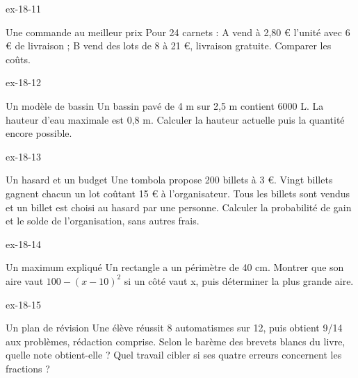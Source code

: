 \clearpage{}
\begin{blocLivre}{ex-18-11}\begin{exercice}[3]{Une commande au meilleur prix}
Pour 24 carnets : A vend à 2,80 € l’unité avec 6 € de livraison ; B vend des lots de 8 à 21 €, livraison gratuite. Comparer les coûts.
\end{exercice}\end{blocLivre}
\begin{blocLivre}{ex-18-12}\begin{exercice}[3]{Un modèle de bassin}
Un bassin pavé de 4 m sur 2,5 m contient 6000 L. La hauteur d’eau maximale est 0,8 m. Calculer la hauteur actuelle puis la quantité encore possible.
\label{fig-ex-18-12}
\end{exercice}\end{blocLivre}
\begin{blocLivre}{ex-18-13}\begin{exercice}[3]{Un hasard et un budget}
Une tombola propose 200 billets à 3 €. Vingt billets gagnent chacun un lot coûtant 15 € à l’organisateur. Tous les billets sont vendus et un billet est choisi au hasard par une personne. Calculer la probabilité de gain et le solde de l’organisation, sans autres frais.
\end{exercice}\end{blocLivre}
\begin{blocLivre}{ex-18-14}\begin{exercice}[3]{Un maximum expliqué}
Un rectangle a un périmètre de 40 cm. Montrer que son aire vaut $100-(x-10)^2$ si un côté vaut x, puis déterminer la plus grande aire.
\label{fig-ex-18-14}
\end{exercice}\end{blocLivre}
\begin{blocLivre}{ex-18-15}\begin{exercice}[3]{Un plan de révision}
Une élève réussit 8 automatismes sur 12, puis obtient 9/14 aux problèmes, rédaction comprise. Selon le barème des brevets blancs du livre, quelle note obtient-elle ? Quel travail cibler si ses quatre erreurs concernent les fractions ?
\end{exercice}\end{blocLivre}

\clearpage
